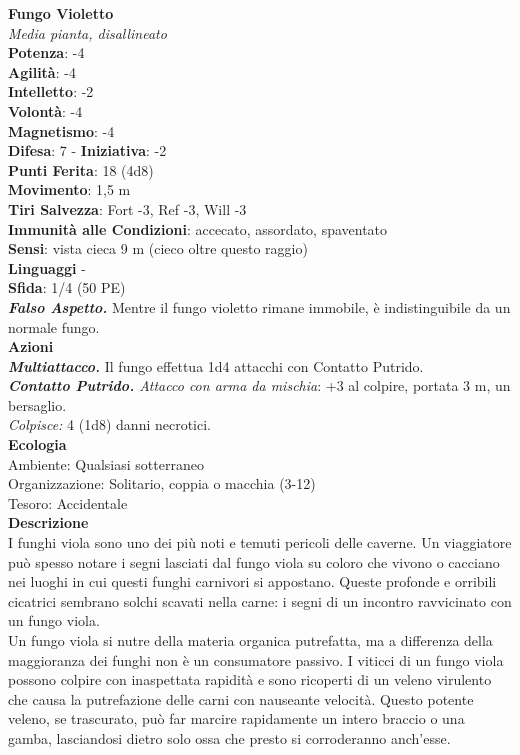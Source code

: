 \begin{multicols}{2}
\medskip\textbf{Fungo Violetto}\\
\emph{Media pianta, disallineato}\\
\textbf{Potenza}: -4\\
\textbf{Agilità}: -4\\
\textbf{Intelletto}: -2\\
\textbf{Volontà}: -4\\
\textbf{Magnetismo}: -4\\
\textbf{Difesa}: 7 - \textbf{Iniziativa}: -2\\
\textbf{Punti Ferita}: 18 (4d8)\\
\textbf{Movimento}: 1,5 m\\
\textbf{Tiri Salvezza}: Fort -3, Ref -3, Will -3\\
\textbf{Immunità alle Condizioni}: accecato, assordato, spaventato\\
\textbf{Sensi}: vista cieca 9 m (cieco oltre questo raggio)\\
\textbf{Linguaggi} -\\
\textbf{Sfida}: 1/4 (50 PE)\smallskip\\
\emph{\textbf{Falso Aspetto.}} Mentre il fungo violetto rimane immobile, è indistinguibile da un normale fungo.\\
\smallskip\textbf{Azioni}\\
\emph{\textbf{Multiattacco.}} Il fungo effettua 1d4 attacchi con Contatto Putrido.\\
\emph{\textbf{Contatto Putrido.} Attacco con arma da mischia}: +3 al colpire, portata 3 m, un bersaglio.\\
\emph{Colpisce:} 4 (1d8) danni necrotici.\\
\textbf{Ecologia}\\
Ambiente: Qualsiasi sotterraneo\\
Organizzazione: Solitario, coppia o macchia (3-12)\\
Tesoro: Accidentale\\
\textbf{Descrizione}\\
I funghi viola sono uno dei più noti e temuti pericoli delle caverne. Un viaggiatore può spesso notare i segni lasciati dal fungo viola su coloro che vivono o cacciano nei luoghi in cui questi funghi carnivori si appostano. Queste profonde e orribili cicatrici sembrano solchi scavati nella carne: i segni di un incontro ravvicinato con un fungo viola.\\
Un fungo viola si nutre della materia organica putrefatta, ma a differenza della maggioranza dei funghi non è un consumatore passivo. I viticci di un fungo viola possono colpire con inaspettata rapidità e sono ricoperti di un veleno virulento che causa la putrefazione delle carni con nauseante velocità. Questo potente veleno, se trascurato, può far marcire rapidamente un intero braccio o una gamba, lasciandosi dietro solo ossa che presto si corroderanno anch’esse.\\

\end{multicols}
